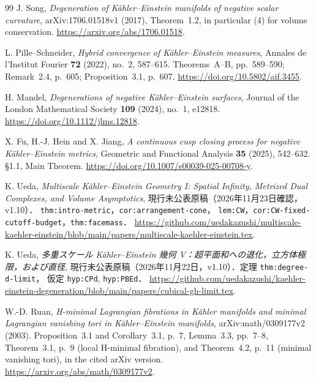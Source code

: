 \begin{thebibliography}{99}
J. Song,
\emph{Degeneration of Kähler--Einstein manifolds of negative scalar curvature},
arXiv:1706.01518v1 (2017), Theorem~1.2, in particular (4) for volume conservation.
\url{https://arxiv.org/abs/1706.01518}.

L. Pille--Schneider,
\emph{Hybrid convergence of Kähler--Einstein measures},
Annales de l'Institut Fourier \textbf{72} (2022), no.~2, 587--615.
Theorems~A--B, pp.~589--590; Remark~2.4, p.~605; Proposition~3.1, p.~607.
\url{https://doi.org/10.5802/aif.3455}.

H. Mandel,
\emph{Degenerations of negative Kähler--Einstein surfaces},
Journal of the London Mathematical Society \textbf{109} (2024), no.~1, e12818.
\url{https://doi.org/10.1112/jlms.12818}.

X. Fu, H.-J. Hein and X. Jiang,
\emph{A continuous cusp closing process for negative Kähler--Einstein metrics},
Geometric and Functional Analysis \textbf{35} (2025), 542--632.
\S1.1, Main Theorem.
\url{https://doi.org/10.1007/s00039-025-00708-y}.

K. Ueda,
\emph{Multiscale K\"ahler--Einstein Geometry I:
Spatial Infinity, Metrized Dual Complexes, and Volume Asymptotics},
現行未公表原稿（2026年11月23日確認，v1.10）．
\texttt{thm:intro-metric}，\texttt{cor:arrangement-cone}，
\texttt{lem:CW}，\texttt{cor:CW-fixed-cutoff-budget}，\texttt{thm:facemass}．
\url{https://github.com/uedakazushi/multiscale-kaehler-einstein/blob/main/papers/multiscale-kaehler-einstein.tex}.

K. Ueda,
\emph{多重スケール Kähler--Einstein 幾何 V：超平面和への退化，立方体極限，および直径},
現行未公表原稿（2026年11月22日，v1.10）．定理 \texttt{thm:degree-d-limit}，
仮定 \texttt{hyp:CPd}, \texttt{hyp:PBEd}．
\url{https://github.com/uedakazushi/kaehler-einstein-degeneration/blob/main/papers/cubical-gh-limit.tex}.

W.-D. Ruan,
\emph{H-minimal Lagrangian fibrations in Kähler manifolds and minimal
Lagrangian vanishing tori in Kähler--Einstein manifolds},
arXiv:math/0309177v2 (2003).
Proposition~3.1 and Corollary~3.1, p.~7, Lemma~3.3, pp.~7--8,
Theorem~3.1, p.~9 (local H-minimal fibration),
and Theorem~4.2, p.~11 (minimal vanishing tori), in the cited arXiv version.
\url{https://arxiv.org/abs/math/0309177v2}.


\end{thebibliography}
